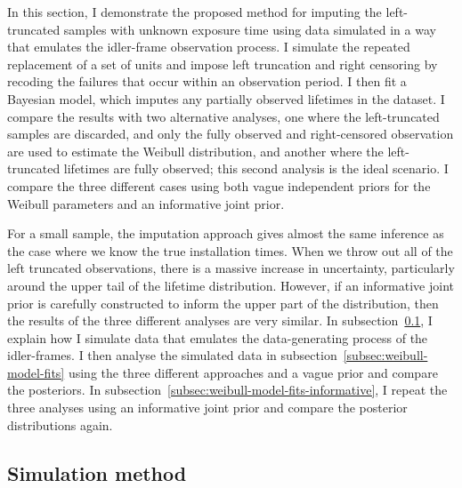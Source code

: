 In this section, I demonstrate the proposed method for imputing the left-truncated samples with unknown exposure time using data simulated in a way that emulates the idler-frame observation process. I simulate the repeated replacement of a set of units and impose left truncation and right censoring by recoding the failures that occur within an observation period. I then fit a Bayesian model, which imputes any partially observed lifetimes in the dataset. I compare the results with two alternative analyses, one where the left-truncated samples are discarded, and only the fully observed and right-censored observation are used to estimate the Weibull distribution, and another where the left-truncated lifetimes are fully observed; this second analysis is the ideal scenario. I compare the three different cases using both vague independent priors for the Weibull parameters and an informative joint prior.

For a small sample, the imputation approach gives almost the same inference as the case where we know the true installation times. When we throw out all of the left truncated observations, there is a massive increase in uncertainty, particularly around the upper tail of the lifetime distribution. However, if an informative joint prior is carefully constructed to inform the upper part of the distribution, then the results of the three different analyses are very similar. In subsection~\ref{subsec:sim-method-weibull}, I explain how I simulate data that emulates the data-generating process of the idler-frames. I then analyse the simulated data in subsection~\ref{subsec:weibull-model-fits} using the three different approaches and a vague prior and compare the posteriors. In subsection~\ref{subsec:weibull-model-fits-informative}, I repeat the three analyses using an informative joint prior and compare the posterior distributions again.

\subsection{Simulation method} \label{subsec:sim-method-weibull}

